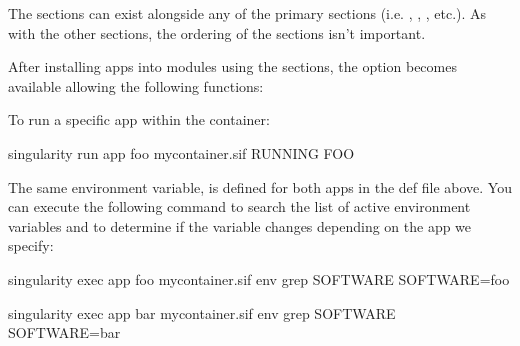 \documentclass[letterpaper,10pt,english]{sphinxmanual}
\begin{document}
The  sections can exist alongside any of the primary sections (i.e.
, , , etc.).  As with the other sections,
the ordering of the  sections isn’t important.

After installing apps into modules using the  sections, the 
option becomes available allowing the following functions:

To run a specific app within the container:

%
\begin{sphinxVerbatim}[commandchars=\\\{\}]
\PYGZpc{} singularity run \PYGZhy{}\PYGZhy{}app foo my\PYGZus{}container.sif
RUNNING FOO
\end{sphinxVerbatim}

The same environment variable,  is defined for both apps in the def
file above. You can execute the following command to search the list of active
environment variables and  to determine if the variable changes
depending on the app we specify:

%
\begin{sphinxVerbatim}[commandchars=\\\{\}]
\PYGZdl{} singularity exec \PYGZhy{}\PYGZhy{}app foo my\PYGZus{}container.sif env \textbar{} grep SOFTWARE
SOFTWARE=foo

\PYGZdl{} singularity exec \PYGZhy{}\PYGZhy{}app bar my\PYGZus{}container.sif env \textbar{} grep SOFTWARE
SOFTWARE=bar
\end{sphinxVerbatim}
\end{document}
